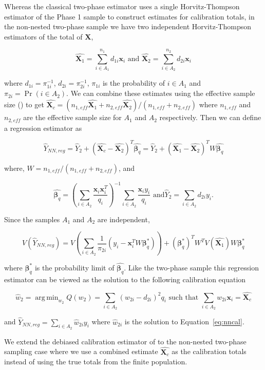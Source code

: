 \documentclass[12pt]{article}
\DeclareMathOperator*{\argmin}{arg\,min}
\renewcommand{\bf}[1]{\mathbf{#1}}
\begin{document}
Whereas the classical two-phase estimator uses a single Horvitz-Thompson
estimator of the Phase 1 sample to construct estimates for calibration totals,
in the non-nested two-phase sample we have two independent Horvitz-Thompson
estimators of the total of $\bf X$,

$$\hat{\bf X_1} = \sum_{i \in A_1}^{n_1} d_{1i} \bf x_i \text{ and } 
\hat{\bf X_2} = \sum_{i \in A_2}^{n_2} d_{2i} \bf x_i $$

where $d_{1i} = \pi_{1i}^{-1}$, $d_{2i} = \pi_{2i}^{-1}$, $\pi_{1i}$ is the
probability of $i \in A_1$ and $\pi_{2i} = \Pr(i \in A_2)$. 
We can combine these estimates using the effective sample size 
(\cite{kish1965survey}) to get
$\hat{\bf X_c} = (n_{1, eff} \hat{\bf X_1} + n_{2, eff}\hat{\bf X_2}) / 
(n_{1, eff} + n_{2, eff})$ where $n_{1, eff}$ and $n_{2, eff}$ are the effective
sample size for $A_1$ and $A_2$ respectively. Then we can define a regression
estimator as

$$
\hat Y_{NN, reg} = \hat Y_2 + (\hat{\bf X_c} - \hat{\bf X_2})^T \hat{\bm \beta_q} = 
\hat Y_2 + (\hat{\bf X_1} - \hat{\bf X_2})^T W\hat{\bm \beta_q}
$$

where, $W = n_{1, eff} / (n_{1, eff} + n_{2, eff})$, and

$$\hat{\bm \beta_q} = \left(\sum_{i \in A_2} 
\frac{\bf x_i \bf x_i^T}{q_i}\right)^{-1} 
\sum_{i \in A_2} \frac{\bf x_i y_i}{q_i} \text{ and
}\hat Y_2 = \sum_{i \in A_2} d_{2i} y_i. $$

Since the samples $A_1$ and $A_2$ are independent, 

$$V(\hat Y_{NN, reg}) = V\left(\sum_{i \in A_2} \frac{1}{\pi_{2i}}(y_i -
\bf x_i^TW\bm \beta^*_q)\right) + (\bm \beta^*_q)^T W^T V(\hat{\bf X_1}) W \bm \beta_q^*$$

where $\bm \beta_q^*$ is the probability limit of $\hat{\bm \beta_q}$. Like the two-phase
sample this regression estimator can be viewed as the solution to the following
calibration equation 

\begin{equation}\label{eq:nncal}
  \hat w_2 = \argmin_{w_2} Q(w_2) = \sum_{i \in A_2} (w_{2i} - d_{2i})^2 q_i 
  \text{ such that } \sum_{i \in A_2} w_{2i} \bf x_i = \hat{\bf X_c}
\end{equation}

and $\hat Y_{NN, reg} = \sum_{i \in A_2} \hat w_{2i} y_i$ where $\hat
w_{2i}$ is the solution to Equation~\ref{eq:nncal}.

We extend the debiased calibration estimator of \cite{kwon2024debiased} to the
non-nested two-phase sampling case where we use a combined estimate 
$\hat{\bm X_c}$ as the calibration totals instead of using the true totals from
the finite population.
\end{document}
